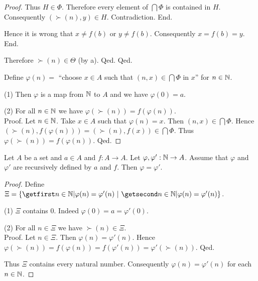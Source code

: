 \documentclass[../arithmetic.tex]{subfiles}
\begin{document}
\begin{forthel}
\begin{proof}
              Thus $H \in \Phi$.
              Therefore every element of $\bigcap \Phi$ is contained in $H$.
              Consequently $(\succ(n),y) \in H$.
              Contradiction.
            End.

            Hence it is wrong that $x \neq f(b)$ or $y \neq f(b)$.
            Consequently $x = f(b) = y$.
          End.

          Therefore $\succ(n) \in \Theta$ (by a).
        Qed.
      Qed.

      Define $\varphi(n) =$ ``choose $x \in A$ such that $(n, x) \in
      \bigcap \Phi$ in $x$'' for $n \in \mathbb{N}$.

      (1) Then $\varphi$ is a map from $\mathbb{N}$ to $A$ and we have
      $\varphi(0) = a$.

      (2) For all $n \in \mathbb{N}$ we have $\varphi(\succ(n)) =
      f(\varphi(n))$. \\
      Proof.
        Let $n \in \mathbb{N}$.
        Take $x \in A$ such that $\varphi(n) = x$.
        Then $(n, x) \in \bigcap \Phi$.
        Hence $(\succ(n), f(\varphi(n))) = (\succ(n), f(x)) \in \bigcap \Phi$.
        Thus $\varphi(\succ(n)) = f(\varphi(n))$.
      Qed.
    \end{proof}
  \end{forthel}

  \begin{forthel}
    \begin{proposition}
      Let $A$ be a set and $a \in A$ and $f : A \to A$.
      Let $\varphi, \varphi' : \mathbb{N} \to A$.
      Assume that $\varphi$ and $\varphi'$ are recursively defined by $a$ and
      $f$.
      Then $\varphi = \varphi'$.
    \end{proposition}
    \begin{proof}
      Define $\Xi = \class{n \in \Nat | \varphi(n) = \varphi'(n)}$.

      (1) $\Xi$ contains $0$.
      Indeed $\varphi(0) = a = \varphi'(0)$.

      (2) For all $n \in \Xi$ we have $\succ(n) \in \Xi$. \\
      Proof.
        Let $n \in \Xi$.
        Then $\varphi(n) = \varphi'(n)$.
        Hence $\varphi(\succ(n))
          = f(\varphi(n))
          = f(\varphi'(n))
          = \varphi'(\succ(n))$.
      Qed.

      Thus $\Xi$ contains every natural number.
      Consequently $\varphi(n) = \varphi'(n)$ for each $n \in \mathbb{N}$.
    \end{proof}
  \end{forthel}
\end{document}
